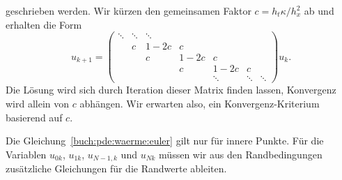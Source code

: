 geschrieben werden.
Wir kürzen den gemeinsamen Faktor $c=h_t\kappa/h_x^2$ ab und erhalten
die Form
\[
u_{k+1}
=
\begin{pmatrix}
\ddots&\ddots&\ddots&    &      &      &      \\
      &     c&  1-2c&  c &      &      &      \\
      &      &    c &1-2c&  c   &      &      \\
      &      &      &  c &1-2c  &  c   &      \\
      &      &      &    &\ddots&\ddots&\ddots
\end{pmatrix}
u_k.
\]
Die Lösung wird sich durch Iteration dieser Matrix finden lassen,
Konvergenz wird allein von $c$ abhängen.
Wir erwarten also, ein Konvergenz-Kriterium basierend auf $c$.

Die Gleichung~\eqref{buch:pde:waerme:euler} gilt nur für innere Punkte.
Für die Variablen $u_{0k}$, $u_{1k}$, $u_{N-1,k}$ und $u_{Nk}$ müssen
wir aus den Randbedingungen zusätzliche Gleichungen für die Randwerte
ableiten.

